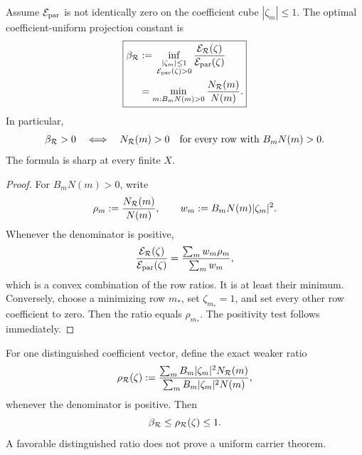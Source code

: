 \begin{theorem}
\label{thm:tpc59-rowwise-occupancy-minimax}
Assume \(\mathcal E_{\rm par}\) is not identically zero on the coefficient cube
\(|\zeta_m|\le1\).  The optimal coefficient-uniform projection constant is
\begin{equation}
 \boxed{
 \begin{aligned}
 \beta_{\mathcal R}
 &:={}
 \inf_{\substack{|\zeta_m|\le1\\\mathcal E_{\rm par}(\zeta)>0}}
 \frac{\mathcal E_{\mathcal R}(\zeta)}{\mathcal E_{\rm par}(\zeta)}\\
 &=\min_{m:B_mN(m)>0}\frac{N_{\mathcal R}(m)}{N(m)}.
 \end{aligned}}
 \label{eq:tpc59-beta-R-minimax}
\end{equation}
In particular,
\begin{equation}
 \beta_{\mathcal R}>0
 \quad\Longleftrightarrow\quad
 N_{\mathcal R}(m)>0
 \quad\text{for every row with }B_mN(m)>0.
 \label{eq:tpc59-beta-positive-test}
\end{equation}
The formula is sharp at every finite \(X\).
\end{theorem}

\begin{proof}
For \(B_mN(m)>0\), write
\[
 \rho_m:=\frac{N_{\mathcal R}(m)}{N(m)},
 \qquad
 w_m:=B_mN(m)|\zeta_m|^2.
\]
Whenever the denominator is positive,
\begin{equation}
 \frac{\mathcal E_{\mathcal R}(\zeta)}{\mathcal E_{\rm par}(\zeta)}
 =\frac{\sum_mw_m\rho_m}{\sum_mw_m},
 \label{eq:tpc59-occupancy-convex-combination}
\end{equation}
which is a convex combination of the row ratios.  It is at least their
minimum.  Conversely, choose a minimizing row \(m_*\), set
\(\zeta_{m_*}=1\), and set every other row coefficient to zero.  Then the
ratio equals \(\rho_{m_*}\).  The positivity test follows immediately.
\end{proof}

For one distinguished coefficient vector, define the exact weaker ratio
\begin{equation}
 \rho_{\mathcal R}(\zeta)
 :=\frac{\sum_mB_m|\zeta_m|^2N_{\mathcal R}(m)}
         {\sum_mB_m|\zeta_m|^2N(m)},
 \label{eq:tpc59-distinguished-occupancy}
\end{equation}
whenever the denominator is positive.  Then
\begin{equation}
 \beta_{\mathcal R}\le\rho_{\mathcal R}(\zeta)\le1.
 \label{eq:tpc59-uniform-distinguished-order}
\end{equation}
A favorable distinguished ratio does not prove a uniform carrier theorem.

